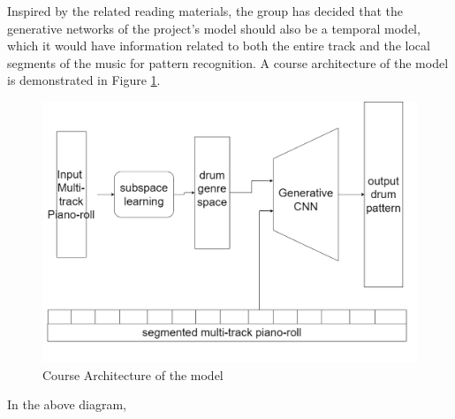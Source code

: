 \begin{par}
    \par \hspace{15pt} Inspired by the related reading materials, the group has decided that the generative networks of the project's model should also be a temporal model, which it would have information related to both the entire track and the local segments of the music for pattern recognition. A course architecture of the model is demonstrated in Figure \ref{fig:archie}. 

    \begin{figure}[H]
        \centering
        \includegraphics[width=5in]{image/proposal_architecture}
        \caption{Course Architecture of the model}
        \label{fig:archie}
    \end{figure}
    
    \par In the above diagram, 
    

\end{par}